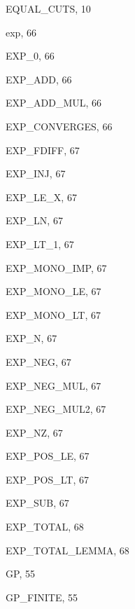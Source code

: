 \begin{theindex}
  \indexspace

  \item {\ptt EQUAL\_CUTS}, 10
  \item {\ptt exp}, 66
  \item {\ptt EXP\_0}, 66
  \item {\ptt EXP\_ADD}, 66
  \item {\ptt EXP\_ADD\_MUL}, 66
  \item {\ptt EXP\_CONVERGES}, 66
  \item {\ptt EXP\_FDIFF}, 67
  \item {\ptt EXP\_INJ}, 67
  \item {\ptt EXP\_LE\_X}, 67
  \item {\ptt EXP\_LN}, 67
  \item {\ptt EXP\_LT\_1}, 67
  \item {\ptt EXP\_MONO\_IMP}, 67
  \item {\ptt EXP\_MONO\_LE}, 67
  \item {\ptt EXP\_MONO\_LT}, 67
  \item {\ptt EXP\_N}, 67
  \item {\ptt EXP\_NEG}, 67
  \item {\ptt EXP\_NEG\_MUL}, 67
  \item {\ptt EXP\_NEG\_MUL2}, 67
  \item {\ptt EXP\_NZ}, 67
  \item {\ptt EXP\_POS\_LE}, 67
  \item {\ptt EXP\_POS\_LT}, 67
  \item {\ptt EXP\_SUB}, 67
  \item {\ptt EXP\_TOTAL}, 68
  \item {\ptt EXP\_TOTAL\_LEMMA}, 68

  \indexspace

  \item {\ptt GP}, 55
  \item {\ptt GP\_FINITE}, 55

  \indexspace


\end{theindex}
